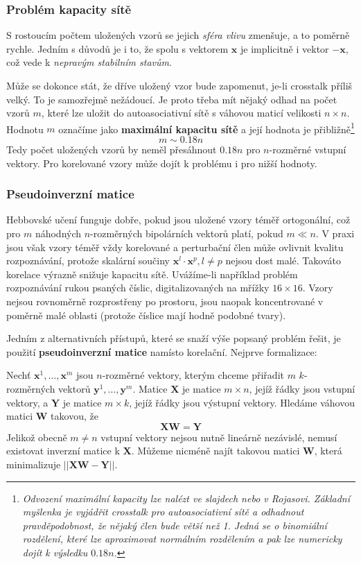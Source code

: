 \documentclass[11pt]{report} %
\renewcommand{\vec}[1]{\mathbf{#1}}
\numberwithin{equation}{section}
\begin{document}
\subsubsection{Problém kapacity sítě}
S rostoucím počtem uložených vzorů se jejich \textit{sféra vlivu} zmenšuje, a to poměrně rychle. Jedním s důvodů je i to, že spolu s vektorem $\vec{x}$ je implicitně  i vektor $-\vec{x}$, což vede k \textit{nepravým stabilním stavům}.

Může se dokonce stát, že dříve uložený vzor bude zapomenut, je-li crosstalk příliš velký. To je samozřejmě nežádoucí. Je proto třeba mít nějaký odhad na počet vzorů $m$, které lze  uložit do autoasociativní sítě s váhovou maticí velikosti $n \times n$. Hodnotu $m$ označíme jako \textbf{maximální kapacitu sítě} a její hodnota je přibližně\footnote{\textit{Odvození maximální kapacity lze nalézt ve slajdech nebo v Rojasovi. Základní myšlenka je vyjádřit crosstalk pro autoasociativní sítě a odhadnout pravděpodobnost, že nějaký člen bude větší než 1. Jedná se o binomiální rozdělení, které lze aproximovat normálním rozdělením a pak lze numericky dojít k výsledku $0.18n$.}}
$$m \sim 0.18n$$
Tedy počet uložených vzorů by neměl přesáhnout $0.18n$ pro $n$-rozměrné vstupní vektory. Pro korelované vzory může dojít k problému i pro nižší hodnoty.

\subsubsection{Pseudoinverzní matice}
Hebbovské učení funguje dobře, pokud jsou uložené vzory téměř ortogonální, což pro $m$ náhodných $n$-rozměrných bipolárních vektorů platí, pokud $m \ll n$. V praxi jsou však vzory téměř vždy korelované a perturbační člen může ovlivnit kvalitu rozpoznávání, protože skalární součiny $\vec{x}^l \cdot \vec{x}^p, l \neq p$ nejsou dost malé. Takováto korelace výrazně snižuje kapacitu sítě. Uvážíme-li například problém rozpoznávání rukou psaných číslic, digitalizovaných na mřížky $16 \times 16$. Vzory nejsou rovnoměrně rozprostřeny po prostoru, jsou naopak koncentrované v poměrně malé oblasti (protože číslice mají hodně podobné tvary).

Jedním z alternativních přístupů, které se snaží výše popsaný problém řešit, je použití \textbf{pseudoinverzní matice} namísto korelační. Nejprve formalizace:

Nechť $\vec{x}^1, \dots, \vec{x}^m$ jsou $n$-rozměrné vektory, kterým chceme přiřadit $m$ $k$-rozměrných vektorů $\vec{y}^1, \dots, \vec{y}^m$. Matice $\vec{X}$ je matice $m \times n$, jejíž řádky jsou vstupní vektory, a $\vec{Y}$ je matice $m \times k$, jejíž řádky jsou výstupní vektory. Hledáme váhovou matici $\vec{W}$ takovou, že
$$\vec{X}\vec{W} = \vec{Y}$$
Jelikož obecně $m \neq n$ vstupní vektory nejsou nutně lineárně nezávislé, nemusí existovat inverzní matice k $\vec{X}$. Můžeme nicméně najít takovou matici $\vec{W}$, která minimalizuje $||\vec{X}\vec{W} - \vec{Y}||$. 
\end{document}

